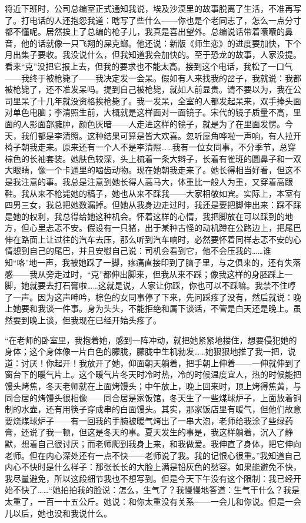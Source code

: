 将近下班时，公司总编室正式通知我说，埃及沙漠里的故事脱离了生活，不准再写了。打电话的人还抱怨我道：瞎写了些什么——你也是个老同志了，怎么一点分寸都不懂呢。居然挨上了总编的枪子儿，我真是喜出望外。总编说话带着囔囔的鼻音，他的话就像一只飞翔的屎克螂。他还说：新版《师生恋》的进度要加快，下个月出集子要收。我没说什么，但我知道我会加快的。至于恐龙的故事，人家没提。看来“克”没把它报上去，但我的要求也不能太高。接到这个电话，我松了一口气——我终于被枪毙了——我决定发一会呆。假如有人来找我的岔子，我就说：我都被枪毙了，还不准发呆吗。提到自己被枪毙，就如人前显贵。请不要以为，我在公司里呆了十几年就没资格挨枪毙了。我一发呆，全室的人都发起呆来，双手捧头面对单色电脑；李清照生前，大概就是这样面对一面镜子。宋代的镜子质量不高，里面的人影面部臃肿，颜色灰暗——人走进这样的镜子，就是为了在里面发愣。今天，我们都是李清照。这种结果可算是皆大欢喜。忽听屋角哗啦一声响，有人拉开椅子朝我走来。原来还有一个人不是李清照……我有一位女同事，不分季节，总穿棕色的长袖套装。她肤色较深，头上梳着一条大辫子，长着有雀斑的圆鼻子和一双大眼睛，像一个卡通里的啮齿动物。现在她朝我走来了。她长得相当好看，但这不是我注意的事。我总是注意到她长得人高马大，体重比一般人为重，又穿着高跟鞋。我从来不枪毙她的稿子，她也从来不踩我——大家相敬如宾。实际上，本室有四男三女，我总把她数漏掉。但她从我身边走过时，我还是要把脚伸出来：踩不踩是她的权利，我总得给她这种机会。怀着这样的心情，我把脚放在可以踩到的地方，但心里忐忑不安。假设有一只猪，出于某种古怪的动机蹲在公路边上，把尾巴伸在路面上让过往的汽车去压，那么听到汽车响时，必然要怀着同样忐忑不安的心情想到自己的尾巴，并且安慰自己说：司机会看到它，他不会压我的……谁知“咯”地一声，我被她踩了一脚，疼痛直接印到了脑子里，与之俱来的，还有失落感——我从旁走过时，“克”都伸出脚来，但我从来不踩；像我这样的身胚踩上一脚，她就要去打石膏啦……这就是说，人家让你踩，你也可以不踩嘛。我禁不住哼了一声。因为这声呻吟，棕色的女同事停了下来，先问踩疼了没有，然后就说：晚上她要和我谈一件事。身为头头，不能拒绝和属下谈话，不管是白天还是晚上。虽然要到晚上谈，但我现在已经开始头疼了。 

“在老师的卧室里，我抱着她，感到一阵冲动，就把她紧紧地搂住，想要侵犯她的身体；这个身体像一片白色的朦胧，朦胧中生机勃发……她狠狠地推了我一把，说道：讨厌！你起开！我放开了她，仰面朝天躺着，把手朝上伸着——一伸就伸到了窗台下的暖气片上。这个暖气片冬天时冷时热，冷的时候温度宜人，热的时候能把馒头烤焦，冬天老师就在上面烤馒头；中午放上，晚上回来时，顶上烤得焦黄，与同合居的烤馒头很相像——同合居是家饭馆，冬天生了一些煤球炉子，上面放着铜制的水壶，还有用筷子穿成串的白面馒头。其实，那家饭店里有暖气，但他们故意要烧煤球炉子——有一回我的手腕被暖气烤出了一串大泡，老师给我涂了些绿药膏，还说了我一顿，但这是冬天的事。夏天发生的事是，我这样躺着，沉入了静默，想着自己很讨厌；而老师爬到我身上来，和我做爱。我伸直了身体，把它伸向老师。但在内心深处还有一点不快——老师说了我。我的记恨心很重。”我知道自己内心不快时是什么样子：那张长长的大脸上满是铅灰色的愁容。如果能避免不快，我尽量避免，所以这段细节我也不想写到。但是今天下午没有这个限制：我已经开始不快了……“她拍拍我的脸说：怎么，生气了？我慢慢地答道：生气干什么？我是太重了，一百一十五公斤。她说：和你太重没有关系——一会儿和你说。但是一会儿以后，她也没和我说什么。 


